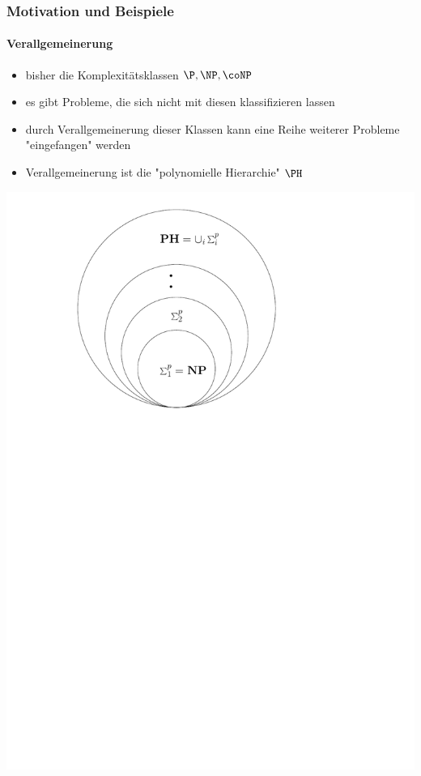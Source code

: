\begin{frame}
		\frametitle{Motivation und Beispiele}
		\framesubtitle{Verallgemeinerung}
		
		\begin{itemize}[<+->]
			\item bisher die Komplexitätsklassen $\P, \NP , \coNP$
			\item es gibt Probleme, die sich nicht mit diesen klassifizieren lassen
			\item durch Verallgemeinerung dieser Klassen kann eine Reihe weiterer Probleme "eingefangen" werden
			\item Verallgemeinerung ist die "polynomielle Hierarchie" $\PH$ 
		\end{itemize}
		\pause
		\includegraphics[scale = 0.4]{images/polyhierarchy.pdf}
\end{frame}
